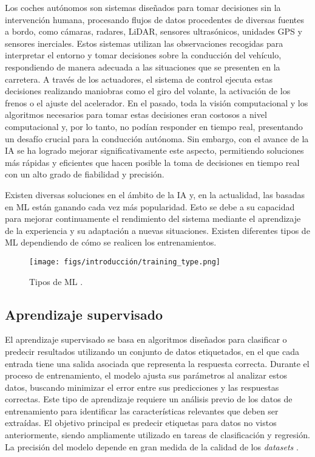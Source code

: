 Los coches autónomos son sistemas diseñados para tomar decisiones sin la intervención humana, procesando flujos de datos procedentes de diversas fuentes a bordo, como cámaras, radares, \ac{LiDAR}, sensores ultrasónicos, unidades \ac{GPS} y sensores inerciales. Estos sistemas utilizan las observaciones recogidas para interpretar el entorno y tomar decisiones sobre la conducción del vehículo, respondiendo de manera adecuada a las situaciones que se presenten en la carretera. A través de los actuadores, el sistema de control ejecuta estas decisiones realizando maniobras como el giro del volante, la activación de los frenos o el ajuste del acelerador. En el pasado, toda la visión computacional y los algoritmos necesarios para tomar estas decisiones eran costosos a nivel computacional y, por lo tanto, no podían responder en tiempo real, presentando un desafío crucial para la conducción autónoma. Sin embargo, con el avance de la \ac{IA} se ha logrado mejorar significativamente este aspecto, permitiendo soluciones más rápidas y eficientes que hacen posible la toma de decisiones en tiempo real con un alto grado de fiabilidad y precisión.

Existen diversas soluciones en el ámbito de la \ac{IA} y, en la actualidad, las basadas en \ac{ML} están ganando cada vez más popularidad. Esto se debe a su capacidad para mejorar continuamente el rendimiento del sistema mediante el aprendizaje de la experiencia y su adaptación a nuevas situaciones. Existen diferentes tipos de \ac{ML} dependiendo de cómo se realicen los entrenamientos.

\begin{figure}[ht]
\begin{center}
\texttt{[image: figs/introducción/training\_type.png]}
\end{center}
\caption{Tipos de \ac{ML} \cite{foto-ml}.}
\label{ml}
\end{figure}

\subsection{Aprendizaje supervisado}

El aprendizaje supervisado se basa en algoritmos diseñados para clasificar o predecir resultados utilizando un conjunto de datos etiquetados, en el que cada entrada tiene una salida asociada que representa la respuesta correcta. Durante el proceso de entrenamiento, el modelo ajusta sus parámetros al analizar estos datos, buscando minimizar el error entre sus predicciones y las respuestas correctas. Este tipo de aprendizaje requiere un análisis previo de los datos de entrenamiento para identificar las características relevantes que deben ser extraídas. El objetivo principal es predecir etiquetas para datos no vistos anteriormente, siendo ampliamente utilizado en tareas de clasificación y regresión. La precisión del modelo depende en gran medida de la calidad de los \textit{datasets} \cite{supervised-learning}.

